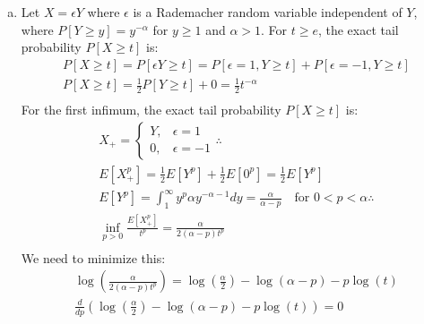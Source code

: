 \documentclass[11pt,a4paper,margin=1in]{article}
\begin{document}
\begin{enumerate}[(a)]
\begin{gather*}
        \inf_{p > 0} \frac{E[X_+^p]}{t^p} \leq e^{-\lambda t} E[e^{\lambda X}] \quad \forall \lambda > 0
    \end{gather*}
    For $\lambda = 0$, we have from the hint $e^{-\lambda t} E[e^{\lambda X}] = 1 \geq P[X > 0]$. 
    Since the inequality holds over all $\lambda \geq 0$, we can take the infimum over $\lambda \geq 0$:
    \[
        \inf_{p > 0} \frac{E[X_+^p]}{t^p} \leq \inf_{\lambda \geq 0} e^{-\lambda t} E[e^{\lambda X}]
    \]
    which gives us the full inequality:
    \[
        P[X \geq t] \leq \inf_{p > 0} \frac{E[X_+^p]}{t^p} \leq \inf_{\lambda \geq 0} e^{-\lambda t} E[e^{\lambda X}]
    \]
    \item Let $X = \epsilon Y$ where $\epsilon$ is a Rademacher random variable 
    independent of $Y$, where $P[Y \geq y] = y^{-\alpha}$ for $y \geq 1$ and $\alpha > 1$.
    For $t \geq e$, the exact tail probability $P[X \geq t]$ is:
    \begin{gather*}
        P[X \geq t] = P[\epsilon Y \geq t] = P[\epsilon = 1, Y \geq t] + P[\epsilon = -1, Y \geq t] \\
        P[X \geq t] = \frac{1}{2} P[Y \geq t] + 0 = \frac{1}{2} t^{-\alpha} \\
    \end{gather*}
    For the first infimum, the exact tail probability $P[X \geq t]$ is:
    \begin{gather*}
        X_+ = \begin{cases}
            Y, & \epsilon = 1 \\
            0, & \epsilon = -1
        \end{cases} \therefore \\
        E[X_+^p] = \frac{1}{2} E[Y^p] + \frac{1}{2} E[0^p] = \frac{1}{2} E[Y^p] \\
        E[Y^p] = \int_1^\infty y^p \alpha y^{-\alpha - 1} dy = \frac{\alpha}{\alpha - p} \quad \text{for } 0 < p < \alpha \therefore \\
        \inf_{p > 0}\frac{E[X_+^p]}{t^p} = \frac{\alpha}{2(\alpha - p)t^p} \\
    \end{gather*}
    We need to minimize this:
    \begin{gather*}
        \log\left(\frac{\alpha}{2(\alpha - p)t^p}\right) = \log\left(\frac{\alpha}{2}\right) - \log(\alpha - p) - p \log(t) \\
        \frac{d}{dp} \left( \log\left(\frac{\alpha}{2}\right) - \log(\alpha - p) - p \log(t) \right) = 0 \\

\end{gather*}
\end{enumerate}
\end{document}
